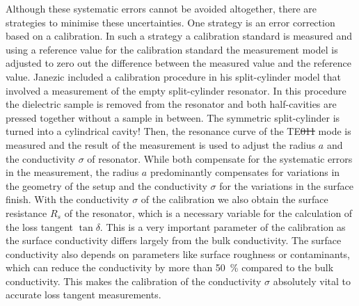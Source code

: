 Although these systematic errors cannot be avoided altogether, there are strategies to minimise these uncertainties. One strategy is an error correction based on a calibration. In such a strategy a calibration standard is measured and using a reference value for the calibration standard the measurement model is adjusted to zero out the difference between the measured value and the reference value. Janezic \cite{janezic} included a calibration procedure in his split-cylinder model that involved a measurement of the empty split-cylinder resonator. In this procedure the dielectric sample is removed from the resonator and both half-cavities are pressed together without a sample in between. The symmetric split-cylinder is turned into a cylindrical cavity! Then, the resonance curve of the TE\st{011} mode is measured and the result of the measurement is used to adjust the radius $a$ and the conductivity $\sigma$ of resonator. While both compensate for the systematic errors in the measurement, the radius $a$ predominantly compensates for variations in the geometry of the setup and the conductivity $\sigma$ for the variations in the surface finish. With the conductivity $\sigma$ of the calibration we also obtain the surface resistance $R_s$ of the resonator, which is a necessary variable for the calculation of the loss tangent $\tan\delta$. This is a very important parameter of the calibration as the surface conductivity differs largely from the bulk conductivity. The surface conductivity also depends on parameters like surface roughness or contaminants, which can reduce the conductivity by more than \SI{50}{\percent} compared to the bulk conductivity. This makes the calibration of the conductivity $\sigma$ absolutely vital to accurate loss tangent measurements.

